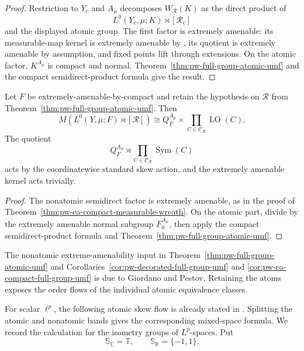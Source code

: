 \begin{proof}
Restriction to \(Y_{\mathrm c}\) and \(A_\mu\) decomposes
\(W_{\mathcal R}(K)\) as the direct product of
\[
 L^0(Y_{\mathrm c},\mu;K)\rtimes[\mathcal R_{\mathrm c}]
\]
and the displayed atomic group. The first factor is extremely amenable: its
measurable-map kernel is extremely amenable by \cite[Theorem~1.1]{PestovSchneider2017}, its
quotient is extremely amenable by assumption, and fixed points lift through
extensions. On the atomic factor, \(K^{A_\mu}\) is compact and normal.
Theorem~\ref{thm:pw-full-group-atomic-umf} and the compact semidirect-product
formula \cite[Proposition~6.1]{KechrisSokic2012} give the result.
\end{proof}

\begin{corollary}\label{cor:pw-ea-compact-full-group-umf}
Let \(F\) be extremely-amenable-by-compact and retain the hypothesis on
\(\mathcal R\) from Theorem~\ref{thm:pw-full-group-atomic-umf}. Then
\[
 M\!\left(L^0(Y,\mu;F)\rtimes[\mathcal R]\right)
 \cong Q_F^{A_\mu}\times
       \prod_{C\in\mathcal C_{\mathcal R}}\operatorname{LO}(C).
\]
The quotient
\[
 Q_F^{A_\mu}\rtimes
 \prod_{C\in\mathcal C_{\mathcal R}}\operatorname{Sym}(C)
\]
acts by the coordinatewise standard skew action, and the extremely amenable
kernel acts trivially.
\end{corollary}

\begin{proof}
The nonatomic semidirect factor is extremely amenable, as in the proof of
Theorem~\ref{thm:pw-ea-compact-measurable-wreath}.  On the atomic part, divide by
the extremely amenable normal subgroup \(F_0^{A_\mu}\), then apply the compact
semidirect-product formula \cite[Proposition~6.1]{KechrisSokic2012} and
Theorem~\ref{thm:pw-full-group-atomic-umf}.
\end{proof}

The nonatomic extreme-amenability input in
Theorem~\ref{thm:pw-full-group-atomic-umf} and
Corollaries~\ref{cor:pw-decorated-full-group-umf} and
\ref{cor:pw-ea-compact-full-group-umf} is due to Giordano and Pestov. Retaining
the atoms exposes the order flows of the individual atomic equivalence
classes.

\medskip
For scalar \(\ell^p\), the following atomic skew flow is already stated
in \cite[Theorem~4.13 and Remark~4.14]{PestovRemarks2002}. Splitting the atomic and
nonatomic bands gives the corresponding mixed-space formula. We record the
calculation for the isometry groups of \(L^p\)-spaces. Put
\[
\mathbb S_{\mathbb C}=\mathbb T,
\qquad
\mathbb S_{\mathbb R}=\{-1,1\}.
\]

